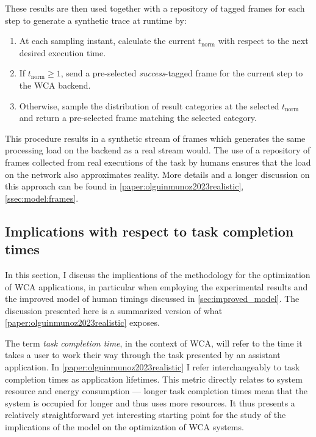 These results are then used together with a repository of tagged frames for each step to generate a synthetic trace at runtime by:
\begin{enumerate}
    \item At each sampling instant, calculate the current \ensuremath{t_\text{norm}} with respect to the next desired execution time.
    \item If \ensuremath{t_\text{norm} \geq 1}, send a pre-selected \emph{success}-tagged frame for the current step to the \gls{WCA} backend.
    \item Otherwise, sample the distribution of result categories at the selected \ensuremath{t_\text{norm}} and return a pre-selected frame matching the selected category.
\end{enumerate}

This procedure results in a synthetic stream of frames which generates the same processing load on the backend as a real stream would.
The use of a repository of frames collected from real executions of the task by humans ensures that the load on the network also approximates reality.
More details and a longer discussion on this approach can be found in \cref{paper:olguinmunoz2023realistic}, \cref{ssec:model:frames}.

\subsection{Implications with respect to task completion times}

In this section, I discuss the implications of the methodology for the optimization of \gls{WCA} applications, in particular when employing the experimental results and the improved model of human timings discussed in \cref{sec:improved_model}.
The discussion presented here is a summarized version of what \cref{paper:olguinmunoz2023realistic} exposes.

The term \emph{task completion time}, in the context of \gls{WCA}, will refer to the time it takes a user to work their way through the task presented by an assistant application.
In \cref{paper:olguinmunoz2023realistic} I refer interchangeably to task completion times as application lifetimes.
This metric directly relates to system resource and energy consumption --- longer task completion times mean that the system is occupied for longer and thus uses more resources.
It thus presents a relatively straightforward yet interesting starting point for the study of the implications of the model on the optimization of \gls{WCA} systems.

